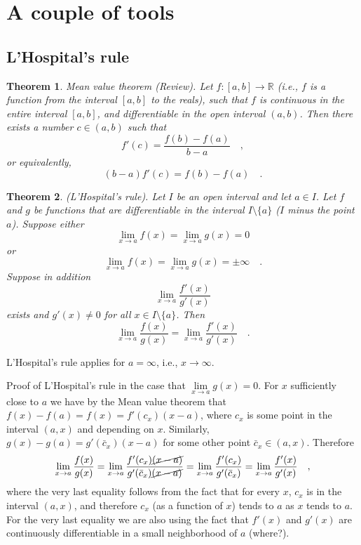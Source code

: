 \documentclass[12pt]{book}
\newtheorem{theorem}{Theorem}[section]
\begin{document}
\section{A couple of tools}
\subsection{L'Hospital's rule}
\begin{theorem}
 Mean value theorem (Review). Let $f:[a,b]\to \mathbb R$ (i.e., $f$ is a function from the interval $[a,b]$ to the reals), such that $f$ is continuous in the entire interval $[a,b]$, and differentiable in the open interval $(a,b)$. Then there exists a number $c\in (a,b)$ such that
\[
f'(c)=\frac{f(b)-f(a)}{b-a}\quad,
\]
or equivalently,
\[
(b-a)f'(c)=f(b)-f(a)\quad .
\]
\end{theorem}

\begin{theorem} 
(L'Hospital's rule). Let $I$ be an open interval and let $a\in I$. Let $f$ and $g$ be functions that are differentiable in the interval $I\setminus \{a\}$ ($I$ minus the point $a$). Suppose either
\[
\lim_{x\to a} f(x)= \lim_{x\to a}g(x)=0
\]
or
\[
\lim_{x\to a} f(x)= \lim_{x\to a}g(x)=\pm \infty\quad .
\]
Suppose in addition
\[
\lim_{x\to a} \frac{f'(x)}{g'(x)}
\]
exists and $g'(x)\neq 0$ for all $x\in I\setminus \{a\}$. Then
\[
\lim_{x\to a}\frac{f(x)}{g(x)}= \lim_{x\to a} \frac{f'(x)}{g'(x)}\quad .
\]
\end{theorem}

L'Hospital's rule applies for $a=\infty$, i.e., $x\to \infty$.

Proof of L'Hospital's rule in the case that $\lim\limits_{x\to a}g(x)=0 $. For $x$ sufficiently close to $a$ we have by the Mean value theorem that $f(x)-f(a)=f(x)=  f'(c_x) (x-a) $, where $c_x$ is some point in the interval $(a,x)$ and depending on $x$. Similarly, $g(x)- g(a)= g'(\bar c_x)(x-a)$ for some other point $\bar c_x\in (a,x)$. Therefore
\[
\lim\limits_{x\to a}\frac{f(x)}{g(x)}=\lim\limits_{x\to a}\frac{f'(c_x) \cancel{(x-a)}}{ g'(\bar c_x)\cancel{(x-a)}} = \lim\limits_{x\to a}\frac{f'(c_x) }{ g'(\bar c_x)}=\lim\limits_{x\to a}\frac{f'(x) }{ g'(x)}\quad ,
\]
where the very last equality follows from the fact that for every $x$, $c_x$ is in the interval $(a,x)$, and therefore $c_x$ (as a function of $x$) tends to $a$ as $x$ tends to $a$. For the very last equality we are also using the fact that $f'(x)$ and $g'(x)$ are continuously differentiable in a small neighborhood of $a$ (where?).
\end{document}
